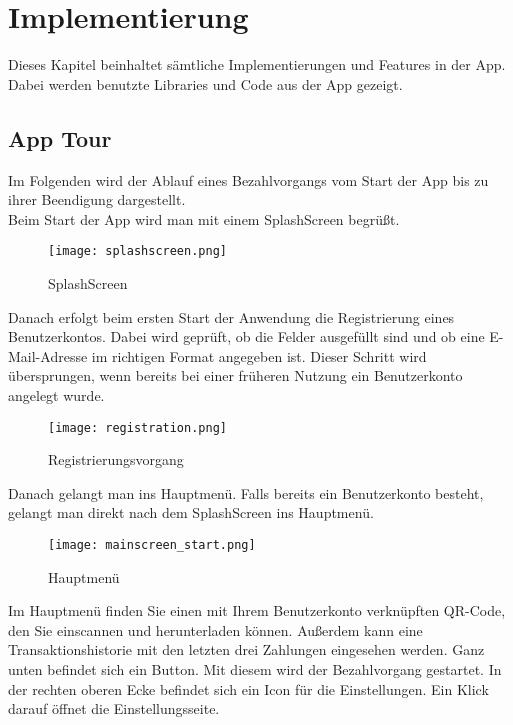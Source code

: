 
\chapter{Implementierung}

Dieses Kapitel beinhaltet sämtliche Implementierungen und Features in der App.
Dabei werden benutzte Libraries und Code aus der App gezeigt.

\section{App Tour}

Im Folgenden wird der Ablauf eines Bezahlvorgangs vom Start der App bis zu ihrer Beendigung dargestellt.\\
Beim Start der App wird man mit einem SplashScreen begrüßt.

\begin{figure}[H]
  \centering
  \texttt{[image: splashscreen.png]}
  \caption{SplashScreen}
\end{figure}

Danach erfolgt beim ersten Start der Anwendung die Registrierung eines Benutzerkontos.
Dabei wird geprüft, ob die Felder ausgefüllt sind und ob eine E-Mail-Adresse im richtigen Format angegeben ist.
Dieser Schritt wird übersprungen, wenn bereits bei einer früheren Nutzung ein Benutzerkonto angelegt wurde.

\begin{figure}[H]
  \centering
  \texttt{[image: registration.png]}
  \caption{Registrierungsvorgang}
\end{figure}

Danach gelangt man ins Hauptmenü.
Falls bereits ein Benutzerkonto besteht, gelangt man direkt nach dem SplashScreen ins Hauptmenü.

\begin{figure}[H]
  \centering
  \texttt{[image: mainscreen\_start.png]}
  \caption{Hauptmenü}
\end{figure}

Im Hauptmenü finden Sie einen mit Ihrem Benutzerkonto verknüpften QR-Code, den Sie einscannen und herunterladen können.
Außerdem kann eine Transaktionshistorie mit den letzten drei Zahlungen eingesehen werden.
Ganz unten befindet sich ein Button.
Mit diesem wird der Bezahlvorgang gestartet.
In der rechten oberen Ecke befindet sich ein Icon für die Einstellungen.
Ein Klick darauf öffnet die Einstellungsseite.


